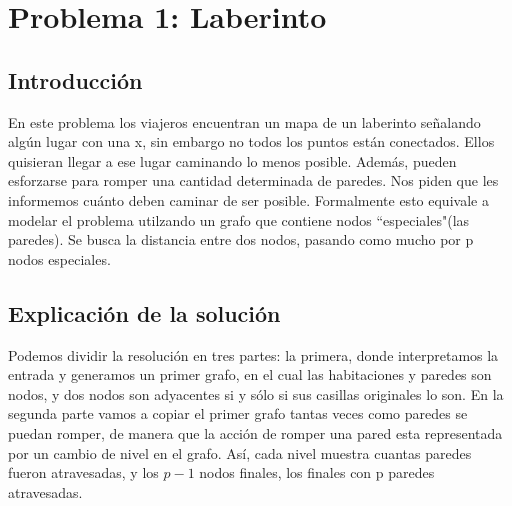 \documentclass[spanish,12pt]{article}
\begin{document}
\author{Grupo  \\Alvarez Vico Jazm\'in\\Cortés Conde Titó Javier María\\Pedraza Marcelo \\ Rozenberg Uriel Jonathan}


\maketitle


\clearpage

\tableofcontents
\cleardoublepage

\section{Problema 1: Laberinto}

\subsection{Introducción}

En este problema los viajeros encuentran un mapa de un laberinto señalando algún lugar con una x, sin embargo no todos los puntos están conectados. Ellos quisieran llegar a ese lugar caminando lo menos posible. Además, pueden esforzarse para romper una cantidad determinada de paredes. Nos piden que les informemos cuánto deben caminar de ser posible.
Formalmente esto equivale a modelar el problema utilzando un grafo que contiene nodos ``especiales"(las paredes). Se busca la distancia entre dos nodos, pasando como mucho por p nodos especiales.

\subsection{Explicación de la solución}
Podemos dividir la resolución en tres partes: la primera, donde interpretamos la entrada y generamos un primer grafo, en el cual las habitaciones y paredes son nodos, y dos nodos son adyacentes si y sólo si sus casillas originales lo son. En la segunda parte vamos a copiar el primer grafo tantas veces como paredes se puedan romper, de manera que la acción de romper una pared esta representada por un cambio de nivel en el grafo. Así, cada nivel muestra cuantas paredes fueron atravesadas, y los $p-1$ nodos finales, los finales con p paredes atravesadas.
\end{document}

